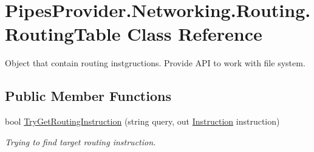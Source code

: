 \hypertarget{class_pipes_provider_1_1_networking_1_1_routing_1_1_routing_table}{}\section{Pipes\+Provider.\+Networking.\+Routing.\+Routing\+Table Class Reference}
\label{class_pipes_provider_1_1_networking_1_1_routing_1_1_routing_table}


Object that contain routing instgructions. Provide A\+PI to work with file system.  


\subsection*{Public Member Functions}
\begin{DoxyCompactItemize}
\item 
bool \mbox{\hyperlink{class_pipes_provider_1_1_networking_1_1_routing_1_1_routing_table_afa326622fc49d66bcd375c08b2f6ff8b}{Try\+Get\+Routing\+Instruction}} (string query, out \mbox{\hyperlink{class_pipes_provider_1_1_networking_1_1_routing_1_1_instruction}{Instruction}} instruction)
\begin{DoxyCompactList}\small\item\em Trying to find target routing instruction. \end{DoxyCompactList}\end{DoxyCompactItemize}
